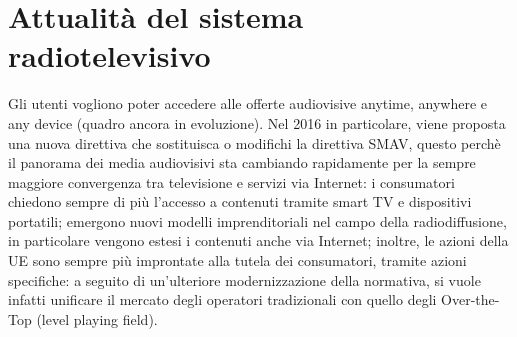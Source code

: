 \section{Attualità del sistema radiotelevisivo}

Gli utenti vogliono poter accedere alle offerte audiovisive anytime, anywhere e any device (quadro ancora in evoluzione).
Nel 2016 in particolare, viene proposta una nuova direttiva che sostituisca o modifichi la direttiva SMAV, questo perchè il panorama dei media audiovisivi sta cambiando rapidamente per la sempre maggiore convergenza tra televisione e servizi via Internet: i consumatori chiedono sempre di più l’accesso a contenuti tramite smart TV e dispositivi portatili; emergono nuovi modelli imprenditoriali nel campo della radiodiffusione, in particolare vengono estesi i contenuti anche via Internet; inoltre, le azioni della UE sono sempre più improntate alla tutela dei consumatori, tramite azioni specifiche: a seguito di un’ulteriore modernizzazione della normativa, si vuole infatti unificare il mercato degli operatori tradizionali con quello degli Over-the-Top (level playing field).